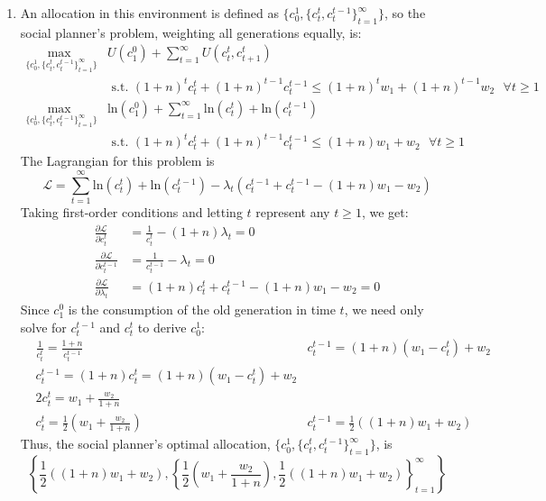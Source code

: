 \documentclass{article}
\newcommand{\loge}[1]{\text{ln}\left(#1\right)}
\newcommand{\usmax}[1]{\underset{\{#1\}}{\text{max }}}
\renewcommand{\L}{\mathcal{L}}
\begin{document}
\begin{enumerate}

	\item An allocation in this environment is defined as $\{c_0^1,\{c_t^t,c_t^{t-1}\}_{t=1}^\infty\}$, so the social planner's problem, weighting all generations equally, is:
		\begin{align*}
			\usmax{c_0^1,\{c_t^t,c_t^{t-1}\}_{t=1}^\infty} &U(c_1^0) + \sum_{t=1}^\infty U(c_t^t,c_{t+1}^t) 				\\
			&\text{ s.t. }(1+n)^tc_t^t + (1+n)^{t-1}c_t^{t-1}\leq (1+n)^t w_1 + (1+n)^{t-1}w_2\text{ }\forall t\geq 1							\\
			\usmax{c_0^1,\{c_t^t,c_t^{t-1}\}_{t=1}^\infty} &\loge{c_1^0} + \sum_{t=1}^\infty \loge{c_t^t} +\loge{c_t^{t-1}}	\\
			 &\text{ s.t. } (1+n)^t c_t^t + (1+n)^{t-1}c_t^{t-1}\leq (1+n)w_1 + w_2\text{ }\forall t\geq 1
		\end{align*}
		The Lagrangian for this problem is
		\[
			\L= \sum_{t=1}^\infty \loge{c_t^t} + \loge{c_t^{t-1}} -\lambda_t\left(c_t^{t-1} + c_t^{t-1}- (1+n)w_1 - w_2\right)
		\]
		Taking first-order conditions and letting $t$ represent any $t\geq 1$, we get:
		\begin{align*}
			\frac{\partial\L}{\partial c_t^t} 		&= \frac{1}{c_t^t} 		- (1+n)\lambda_t	= 0	\\
			\frac{\partial\L}{\partial c_t^{t-1}} 	&= \frac{1}{c_t^{t-1}} 	- \lambda_t			= 0	\\
			\frac{\partial\L}{\partial \lambda_t} 	&= (1+n)c_t^t + c_t^{t-1} - (1+n)w_1 - w_2	= 0		
		\end{align*}
		Since $c_1^0$ is the consumption of the old generation in time $t$, we need only solve for $c_t^{t-1}$ and $c_t^t$ to derive $c_0^1$:
		\begin{align*}
			& \frac{1}{c_t^t}  = \frac{1+n}{c_t^{t-1}}					& c_t^{t-1} = (1+n)(w_1-c_t^t) + w_2 	\\
			& c_t^{t-1} = (1+n)c_t^t = (1+n)(w_1-c_t^t) + w_2												\\
			& 2c_t^t 	= w_1 + \frac{w_2}{1+n}																\\
			& c_t^t		= \frac{1}{2}\left(w_1 + \frac{w_2}{1+n}\right) & c_t^{t-1}	= \frac{1}{2}\left((1+n)w_1 + w_2\right)
		\end{align*}
		Thus, the social planner's optimal allocation, $\{c_0^1,\{c_t^t,c_t^{t-1}\}_{t=1}^\infty\}$, is 
		\[
			\left\{\frac{1}{2}\left((1+n)w_1 + w_2\right),\left\{\frac{1}{2}\left(w_1 + \frac{w_2}{1+n}\right),\frac{1}{2}\left((1+n)w_1 + w_2\right)\right\}_{t=1}^\infty\right\}
		\]
		

\end{enumerate}
\end{document}
